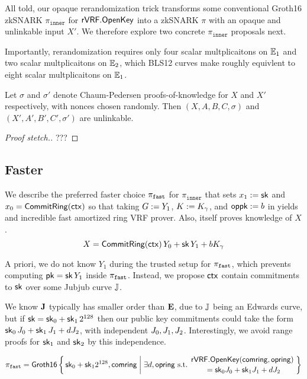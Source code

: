 All told, our opaque rerandomization trick transforms some conventional
Groth16 zkSNARK $\pi_{\mathtt{inner}}$ for ${\mathsf{rVRF}}.{\mathsf{OpenKey}}$
into a zkSNARK $\pi$ with an opaque and unlinkable input $X'$.
We therefore explore two concrete $\pi_{\mathtt{inner}}$ proposals next.

Importantly, rerandomization requires only
 four scalar multplicaitons on ${\mathbb{E}}_1$ and
 two scalar multplicaitons on ${\mathbb{E}}_2$,
which  BLS12 curves make roughly equivlent to
 eight scalar multplicaitons on ${\mathbb{E}}_1$.


\begin{proposition}\label{prop:unlinkable}
Let $\sigma$ and $\sigma'$ denote Chaum-Pedersen proofs-of-knowledge
 for $X$ and $X'$ respectively, with nonces chosen randomly.
Then $(X,A,B,C,\sigma)$ and $(X',A',B',C',\sigma')$ are unlinkable.
\end{proposition}

\begin{proof}[Proof stetch.]
???
\end{proof}

\subsection{Faster}
\label{subsec:rvrf_faster}

We describe the preferred faster choice $\pi_{\mathtt{fast}}$ for $\pi_{\mathtt{inner}}$
that sets $x_1 := \mathsf{sk}$ and $x_0 = {\mathsf{CommitRing}}(\mathsf{ctx})$ so that
taking $G := Y_1$, $K := K_\gamma$, and $\mathsf{oppk} := b$ in \PedVRF
yields and incredible fast amortized ring VRF prover.
Also, \PedVRF itself proves knowledge of $X$.
$$ X = {\mathsf{CommitRing}}(\mathsf{ctx})\, Y_0 + \mathsf{sk}\, Y_1 + b K_\gamma $$

A priori, we do not know $Y_1$ during the trusted setup for $\pi_{\mathtt{fast}}$,
which prevents computing $\mathsf{pk} = \mathsf{sk}\, Y_1$ inside $\pi_{\mathtt{fast}}$.
Instead, we propose $\mathsf{ctx}$ contain commitments to $\mathsf{sk}$ over
some Jubjub curve ${\mathbb{J}}$.  

We know ${\mathbf{J}}$ typically has smaller order than ${\mathbf{E}}$,
due to ${\mathbb{J}}$ being an Edwards curve, but 
if $\mathsf{sk} = \mathsf{sk}_0 + \mathsf{sk}_1 \, 2^{128}$ then our public key commitments could
take the form $\mathsf{sk}_0\, J_0 + \mathsf{sk}_1\, J_1 + d J_2$,
with independent $J_0,J_1,J_2$.
Interestingly, we avoid range proofs for $\mathsf{sk}_1$ and $\mathsf{sk}_2$
by this independence. 

$$ \pifast = \rrSNARK \Setst{ \sk_0 + \sk_1 2^{128}, \comring }{
 \exists d,\openring \textrm{\ s.t.\ }
 \genfrac{}{}{0pt}{}{\rVRF.\OpenKey(\comring,\openring)}{\,\, = \sk_0 \genJ_0 + \sk_1 \genJ_1 + d \genJ_2}
} $$ %

